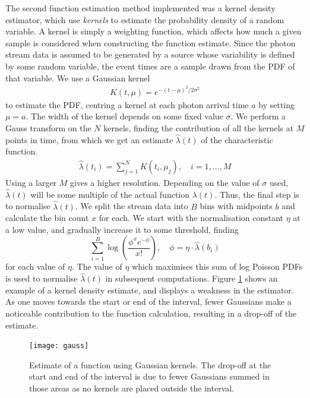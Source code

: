 \documentclass[a4paper,11pt]{article}
\begin{document}
   The second function estimation method implemented was a kernel density
   estimator, which use \emph{kernels} to estimate the probability density of a
   random variable. A kernel is simply a weighting function, which affects how
   much a given sample is considered when constructing the function
   estimate. Since the photon stream data is assumed to be generated by a source
   whose variability is defined by some random variable, the event times are a
   sample drawn from the PDF of that variable. We use a Gaussian kernel
   \begin{align}
   K(t,\mu)=e^{-(t-\mu)^2/2\sigma^2}
   \end{align}
   to estimate the PDF, centring a kernel at each photon arrival time $a$ by
   setting $\mu=a$. The width of the kernel depends on some fixed value
   $\sigma$. We perform a Gauss transform on the $N$ kernels, finding the
   contribution of all the kernels at $M$ points in time, from which we get an
   estimate $\hat{\lambda}(t)$ of the characteristic function.
   \begin{align}
   \hat{\lambda}(t_i) = \sum_{j=1}^N K(t_i,\mu_j), \quad i=1,\dots,M
   \end{align}
   Using a larger $M$ gives a higher resolution. Depending on the value of
   $\sigma$ used, $\hat{\lambda}(t)$ will be some multiple of the actual
   function $\lambda(t)$. Thus, the final step is to normalise
   $\hat{\lambda}(t)$. We split the stream data into $B$ bins with midpoints $b$
   and calculate the bin count $x$ for each. We start with the normalisation
   constant $\eta$ at a low value, and gradually increase it to some threshold,
   finding
   \begin{equation}\label{eq:normcalc}
   \sum_{i=1}^B
   \log\left(\frac{\phi^xe^{-\phi}}{x!}\right), \quad \phi=\eta\cdot\hat{\lambda}(b_i)
   \end{equation}
   for each value of $\eta$. The value of $\eta$ which maximises this sum of log
   Poisson PDFs is used to normalise $\hat{\lambda}(t)$ in subsequent
   computations. Figure \ref{fig:kde} shows an example of a kernel density
   estimate, and displays a weakness in the estimator. As one moves towards the
   start or end of the interval, fewer Gaussians make a noticeable contribution
   to the function calculation, resulting in a drop-off of the estimate.
   \begin{figure}[h]
   \texttt{[image: gauss]}
   \caption{Estimate of a function using Gaussian kernels. The drop-off at the
   start and end of the interval is due to fewer Gaussians summed in those areas
   as no kernels are placed outside the interval.}
   \label{fig:kde}
   \end{figure}
\end{document}
